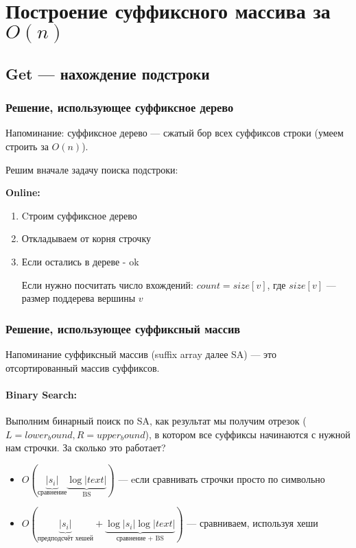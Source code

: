 \section{Построение суффиксного массива за $O(n)$}

\subsection{Get --- нахождение подстроки}

\subsubsection{Решение, использующее суффиксное дерево}
Напоминание: суффиксное дерево --- сжатый бор всех суффиксов строки (умеем строить за $O(n)$).

Решим вначале задачу поиска подстроки:

\textbf{Online:}
	\begin{enumerate}
	\item Cтроим суффиксное дерево
	\item Откладываем от корня строчку
	\item Если остались в дереве - ok
	
	Если нужно посчитать число вхождений: $count = size[v]$, где $size[v]$ --- размер поддерева вершины $v$
	\end{enumerate}

\subsubsection{Решение, использующее суффиксный массив}

Напоминание суффиксный массив (suffix array далее SA) --- это отсортированный массив суффиксов.

\paragraph{Binary Search:}

Выполним бинарный поиск по SA, как результат мы получим отрезок ($L = lower_bound, R = upper_bound$), в котором все суффиксы начинаются с нужной нам строчки.
За сколько это работает?
	\begin{itemize}
		\item $O(\underbrace{|s_i|}_{\text{сравнение}}\underbrace{\log |text|}_{\text{BS}})$ --- eсли сравнивать строчки просто по символьно
		\item $O(\underbrace{|s_i|}_{\text{предподсчёт хешей}} + \underbrace{\log |s_i| \log |text|}_{\text{сравнение + BS}})$ --- сравниваем, используя хеши
	\end{itemize}	 

